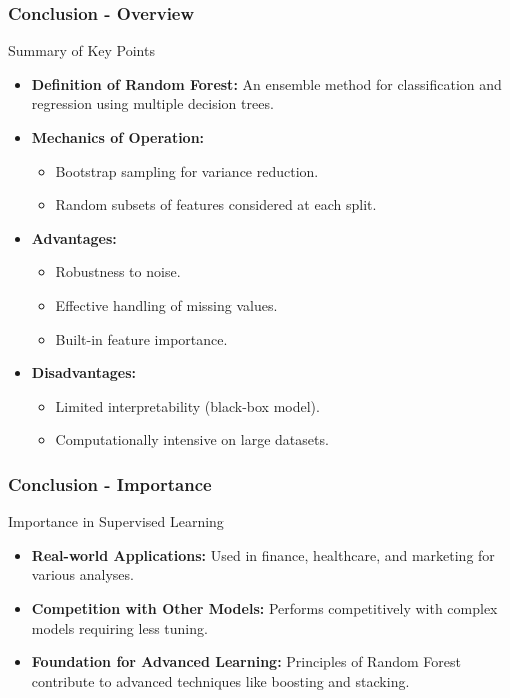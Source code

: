 \documentclass[aspectratio=169]{beamer}
\begin{document}
\begin{frame}[fragile]
    \frametitle{Conclusion - Overview}
    \begin{block}{Summary of Key Points}
        \begin{itemize}
            \item \textbf{Definition of Random Forest:}
              An ensemble method for classification and regression using multiple decision trees.
            \item \textbf{Mechanics of Operation:}
              \begin{itemize}
                  \item Bootstrap sampling for variance reduction.
                  \item Random subsets of features considered at each split.
              \end{itemize}
            \item \textbf{Advantages:}
              \begin{itemize}
                  \item Robustness to noise.
                  \item Effective handling of missing values.
                  \item Built-in feature importance.
              \end{itemize}
            \item \textbf{Disadvantages:}
              \begin{itemize}
                  \item Limited interpretability (black-box model).
                  \item Computationally intensive on large datasets.
              \end{itemize}
        \end{itemize}
    \end{block}
\end{frame}

\begin{frame}[fragile]
    \frametitle{Conclusion - Importance}
    \begin{block}{Importance in Supervised Learning}
        \begin{itemize}
            \item \textbf{Real-world Applications:}
              Used in finance, healthcare, and marketing for various analyses.
            \item \textbf{Competition with Other Models:}
              Performs competitively with complex models requiring less tuning.
            \item \textbf{Foundation for Advanced Learning:}
              Principles of Random Forest contribute to advanced techniques like boosting and stacking.
        \end{itemize}
    \end{block}
\end{frame}
\end{document}
